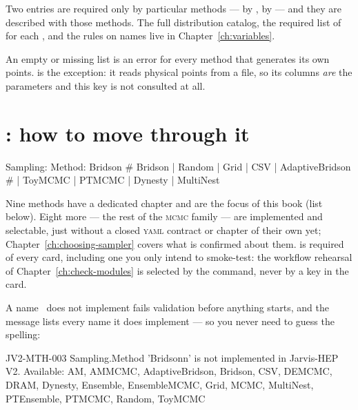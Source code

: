 Two  entries are required only by particular methods ---
 by ,  by  --- and they are
described with those methods. The full distribution catalog, the required list of
 for each , and the rules on names live in
Chapter~\ref{ch:variables}.

An empty or missing  list is an error for every method that generates
its own points.  is the exception: it reads physical points from a file, so
its columns \emph{are} the parameters and this key is not consulted at all.

\section{: how to move through it}
\label{sec:method}

\begin{yamlwin}
Sampling:
  Method: Bridson    # Bridson | Random | Grid | CSV | AdaptiveBridson
                     # | ToyMCMC | PTMCMC | Dynesty | MultiNest
\end{yamlwin}

Nine methods have a dedicated chapter and are the focus of this book (list below).
Eight more --- the rest of the \textsc{mcmc} family --- are implemented and
selectable, just without a closed \textsc{yaml} contract or chapter of their own yet;
Chapter~\ref{ch:choosing-sampler} covers what is confirmed about them.
 is required of every card, including one you only intend to smoke-test:
the workflow rehearsal of Chapter~\ref{ch:check-modules} is selected by the
 command, never by a key in the card.

A name \Jtwo\ does not implement fails validation before anything starts, and the message
lists every name it does implement --- so you never need to guess the spelling:

\begin{terminal}
\begin{jout}
[error] JV2-MTH-003  Sampling.Method
    'Bridsonn' is not implemented in Jarvis-HEP V2. Available:
    AM, AMMCMC, AdaptiveBridson, Bridson, CSV, DEMCMC, DRAM,
    Dynesty, Ensemble, EnsembleMCMC, Grid, MCMC, MultiNest,
    PTEnsemble, PTMCMC, Random, ToyMCMC
\end{jout}
\end{terminal}

